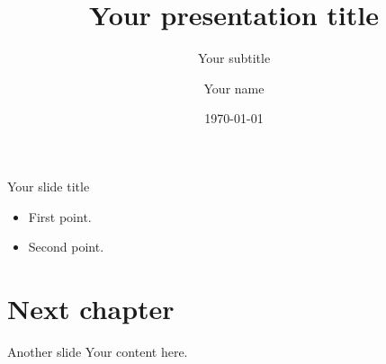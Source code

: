 \documentclass[aspectratio=169,11pt]{beamer}
\title{Your presentation title}
\subtitle{Your subtitle}
\author[Your name]{Your name}
\institute[DLR Institute]{German Aerospace Center (DLR)\\Your institute}
\date{\today}
\begin{document}
\DLRtitleframe
\begin{frame}[t]{Your slide title}
\begin{itemize}
\item First point.
\item Second point.
\end{itemize}
\end{frame}
\section{Next chapter}
\begin{frame}[t]{Another slide}
Your content here.
\end{frame}
\end{document}
